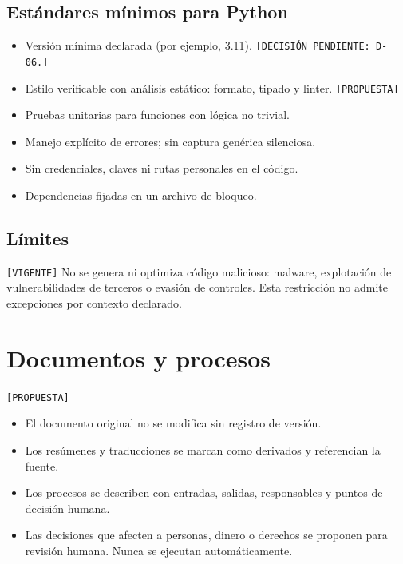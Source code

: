 \documentclass[12pt]{article}
\begin{document}
\subsection{Estándares mínimos para Python}

\begin{itemize}
    \item Versión mínima declarada (por ejemplo, 3.11). \texttt{[DECISIÓN PENDIENTE: D-06.]}
    \item Estilo verificable con análisis estático: formato, tipado y linter. \texttt{[PROPUESTA]}
    \item Pruebas unitarias para funciones con lógica no trivial.
    \item Manejo explícito de errores; sin captura genérica silenciosa.
    \item Sin credenciales, claves ni rutas personales en el código.
    \item Dependencias fijadas en un archivo de bloqueo.
\end{itemize}

\subsection{Límites}

\texttt{[VIGENTE]} No se genera ni optimiza código malicioso: malware,
explotación de vulnerabilidades de terceros o evasión de controles. Esta
restricción no admite excepciones por contexto declarado.

\section{Documentos y procesos}

\texttt{[PROPUESTA]}

\begin{itemize}
    \item El documento original no se modifica sin registro de versión.
    \item Los resúmenes y traducciones se marcan como derivados y referencian la fuente.
    \item Los procesos se describen con entradas, salidas, responsables y puntos de decisión humana.
    \item Las decisiones que afecten a personas, dinero o derechos se proponen para revisión humana. Nunca se ejecutan automáticamente.
\end{itemize}
\end{document}
